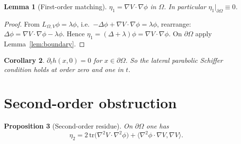 \documentclass[11pt]{article}
\newcommand{\Om}{\Omega}
\newcommand{\1}{\mathbf 1}
\newcommand{\tr}{\mathrm{tr}}
\newtheorem{lem}{Lemma}
\newtheorem{prop}[lem]{Proposition}
\newtheorem{cor}[lem]{Corollary}
\begin{document}
\begin{lem}[First-order matching]\label{lem:first}
$\eta_1=\nabla V\cdot\nabla\phi$ in $\Om$. In particular
$\eta_1|_{\partial\Om}\equiv 0$.
\end{lem}

\begin{proof}
From $L_{\Om,V}\phi=\lambda\phi$, i.e.\
$-\Delta\phi+\nabla V\cdot\nabla\phi=\lambda\phi$, rearrange:
$\Delta\phi=\nabla V\cdot\nabla\phi-\lambda\phi$. Hence
$\eta_1=(\Delta+\lambda)\phi=\nabla V\cdot\nabla\phi$. On
$\partial\Om$ apply Lemma~\ref{lem:boundary}.
\end{proof}

\begin{cor}\label{cor:first}
$\partial_t h(x,0)=0$ for $x\in\partial\Om$. So the lateral parabolic
Schiffer condition holds at order zero and one in $t$.
\end{cor}

\section{Second-order obstruction}

\begin{prop}[Second-order residue]\label{prop:second}
On $\partial\Om$ one has
\begin{equation}
\label{eq:eta2}
    \eta_2 = 2\,\tr\!\bigl(\nabla^2V\cdot\nabla^2\phi\bigr)
        + \bigl\langle\nabla^2\phi\cdot\nabla V,\nabla V\bigr\rangle.
\end{equation}
\end{prop}
\end{document}

